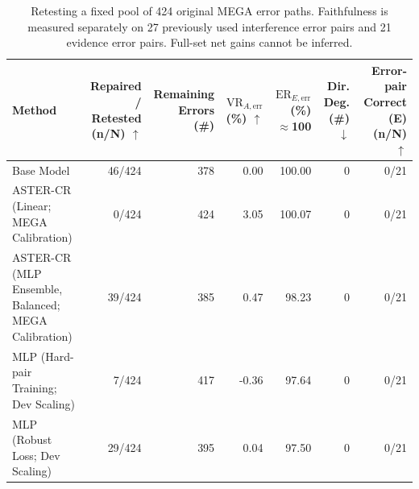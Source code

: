 \begin{table}[t]
\centering
\small
\setlength{\tabcolsep}{3pt}
\begin{tabularx}{\textwidth}{@{}>{\raggedright\arraybackslash}Xrrrrrr@{}}
\toprule
Method & \shortstack{Repaired / Retested\\ (n/N) $\uparrow$} & \shortstack{Remaining Errors\\ (\#)} & \shortstack{$\mathrm{VR}_{A,\mathrm{err}}$\\ (\%) $\uparrow$} & \shortstack{$\mathrm{ER}_{E,\mathrm{err}}$\\ (\%) $\approx$100} & \shortstack{Dir. Deg.\\ (\#) $\downarrow$} & \shortstack{Error-pair Correct\\ (E) (n/N) $\uparrow$} \\
\midrule
Base Model & 46/424 & 378 & 0.00 & 100.00 & 0 & 0/21 \\
ASTER-CR (Linear; MEGA Calibration) & 0/424 & 424 & 3.05 & 100.07 & 0 & 0/21 \\
ASTER-CR (MLP Ensemble, Balanced; MEGA Calibration) & 39/424 & 385 & 0.47 & 98.23 & 0 & 0/21 \\
MLP (Hard-pair Training; Dev Scaling) & 7/424 & 417 & -0.36 & 97.64 & 0 & 0/21 \\
MLP (Robust Loss; Dev Scaling) & 29/424 & 395 & 0.04 & 97.50 & 0 & 0/21 \\
\bottomrule
\end{tabularx}
\caption{Retesting a fixed pool of 424 original MEGA error paths. Faithfulness is measured separately on 27 previously used interference error pairs and 21 evidence error pairs. Full-set net gains cannot be inferred.}
\label{tab:aster-main-07}
\end{table}

